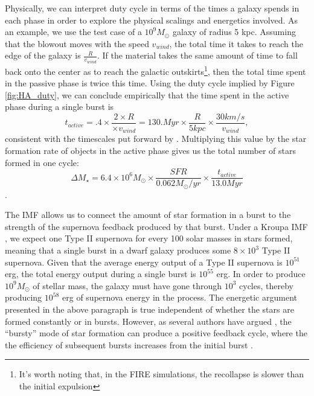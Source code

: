 \documentclass[iop]{emulateapj}
\begin{document}
Physically, we can interpret duty cycle in terms of the times a galaxy spends in each phase in order to explore the physical scalings and energetics involved. As an example, we use the test case of a $10^9 M_{\odot}$ galaxy of radius 5 kpc. Assuming that the blowout moves with the speed $v_{wind}$, the total time it takes to reach the edge of the galaxy is $\frac{R}{v_{wind}}$. If the material takes the same amount of time to fall back onto the center as to reach the galactic outskirts\footnote{It's worth noting that, in the FIRE simulations, the recollapse is slower than the initial expulsion}, then the total time spent in the passive phase is twice this time. Using the duty cycle implied by Figure \ref{fig:HA_duty}, we can conclude empirically that the time spent in the active phase during a single burst is $$t_{active} = .4 \times\frac{2 \times R}{\times v_{wind}} = 130. Myr \times \frac{R}{5 kpc}\times \frac{30 km/s}{v_{wind}},  $$ consistent with the timescales put forward by \cite{EB17}. Multiplying this value by the star formation rate of objects in the active phase gives us the total number of stars formed in one cycle:
$$\Delta M_{\star} = 6.4 \times 10^6 M_{\odot} \times \frac{SFR}{0.062 M_{\odot}/yr} \times \frac{t_{active}}{13.0 Myr}$$.

The IMF allows us to connect the amount of star formation in a burst to the strength of the supernova feedback produced by that burst. Under a Kroupa IMF \citep{Kroupa02}, we expect one Type II supernova for every 100 solar masses in stars formed, meaning that a single burst in a dwarf galaxy produces some $8 \times 10^3$ Type II supernova. Given that the average energy output of a Type II supernova is $10^{51}$ erg, the total energy output during a single burst is $10^{55}$ erg. In order to produce $10^9 M_{\odot}$ of stellar mass, the galaxy must have gone through $10^3$ cycles, thereby producing $10^{58}$ erg of supernova energy in the process. The energetic argument presented in the above paragraph is true independent of whether the stars are formed constantly or in bursts. However, as several authors have argued \citep{Governato12,GK13}, the ``bursty'' mode of star formation can produce a positive feedback cycle, where the the efficiency of subsequent bursts increases from the initial burst \cite[see][]{Pontzen12,Governato12}. 

\end{document}
